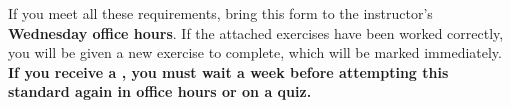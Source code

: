\documentclass[12pt]{article}
\begin{document}
If you meet all these requirements,
bring this form to the instructor's \textbf{Wednesday office hours}.
If the attached exercises have been worked correctly, you will be given
a new exercise to complete, which will be marked immediately.
\textbf{If you
receive a \checkmark{}, you must wait a week before attempting this standard
again in office hours or on a quiz.}
\end{document}
